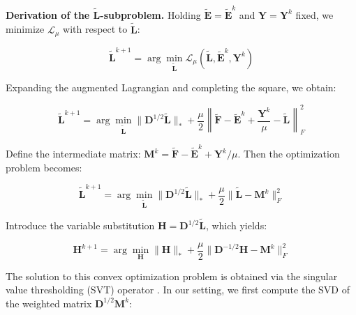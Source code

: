 \noindent\textbf{Derivation of the $\tilde{\mathbf{L}}$-subproblem.}
Holding $\tilde{\mathbf{E}} = \tilde{\mathbf{E}}^k$ and $\mathbf{Y} = \mathbf{Y}^k$ fixed, we minimize $\mathcal{L}_{\mu}$ with respect to $\tilde{\mathbf{L}}$:

\begin{equation}
\tilde{\mathbf{L}}^{k+1} = \arg\min_{\tilde{\mathbf{L}}} \mathcal{L}_{\mu}(\tilde{\mathbf{L}}, \tilde{\mathbf{E}}^k, \mathbf{Y}^k)
\end{equation}

Expanding the augmented Lagrangian and completing the square, we obtain:

\begin{equation}
\tilde{\mathbf{L}}^{k+1} = \arg\min_{\tilde{\mathbf{L}}} \|\mathbf{D}^{1/2} \tilde{\mathbf{L}}\|_* + \frac{\mu}{2} \left\| \tilde{\mathbf{F}} - \tilde{\mathbf{E}}^k + \frac{\mathbf{Y}^k}{\mu} - \tilde{\mathbf{L}} \right\|_F^2
\end{equation}

Define the intermediate matrix: $\mathbf{M}^k = \tilde{\mathbf{F}} - \tilde{\mathbf{E}}^k + {\mathbf{Y}^k}/{\mu}$.
Then the optimization problem becomes:

\begin{equation}
\tilde{\mathbf{L}}^{k+1} = \arg\min_{\tilde{\mathbf{L}}} \|\mathbf{D}^{1/2} \tilde{\mathbf{L}}\|_* + \frac{\mu}{2} \|\tilde{\mathbf{L}} - \mathbf{M}^k\|_F^2
\end{equation}

Introduce the variable substitution $\mathbf{H} = \mathbf{D}^{1/2} \tilde{\mathbf{L}}$, which yields:

\begin{equation}
\mathbf{H}^{k+1} = \arg\min_{\mathbf{H}} \|\mathbf{H}\|_* + \frac{\mu}{2} \|\mathbf{D}^{-1/2} \mathbf{H} - \mathbf{M}^k\|_F^2
\end{equation}

The solution to this convex optimization problem is obtained via the singular value thresholding (SVT) operator \cite{cai2010singular,RPCA}. 
In our setting, we first compute the SVD of the weighted matrix $\mathbf{D}^{1/2} \mathbf{M}^k$:

